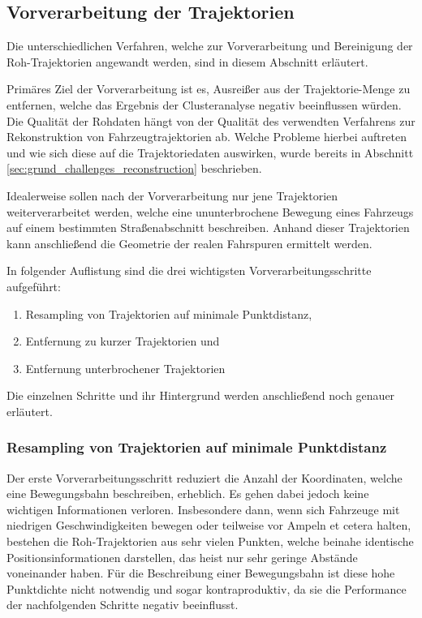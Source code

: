 \subsection{Vorverarbeitung der Trajektorien}
\label{sec:realisation_preprocessing}

Die unterschiedlichen Verfahren, welche zur Vorverarbeitung und Bereinigung der Roh-Trajektorien angewandt werden,
sind in diesem Abschnitt erläutert.

Primäres Ziel der Vorverarbeitung ist es, Ausreißer aus der
Trajektorie-Menge zu entfernen, welche das Ergebnis der Clusteranalyse negativ beeinflussen würden.
Die Qualität der Rohdaten hängt von der Qualität des verwendten Verfahrens zur Rekonstruktion von Fahrzeugtrajektorien
ab. Welche Probleme hierbei auftreten und wie sich diese auf die Trajektoriedaten auswirken, wurde bereits in
Abschnitt \ref{sec:grund_challenges_reconstruction} beschrieben.

Idealerweise sollen nach der Vorverarbeitung nur jene Trajektorien weiterverarbeitet werden,
welche eine ununterbrochene Bewegung eines Fahrzeugs auf einem bestimmten Straßenabschnitt beschreiben.
Anhand dieser Trajektorien kann anschließend die Geometrie der realen Fahrspuren ermittelt werden.

In folgender Auflistung sind die drei wichtigsten Vorverarbeitungsschritte aufgeführt:

\begin{enumerate}
    \item Resampling von Trajektorien auf minimale Punktdistanz,
    \item Entfernung zu kurzer Trajektorien und
    \item Entfernung unterbrochener Trajektorien
\end{enumerate}

Die einzelnen Schritte und ihr Hintergrund werden anschließend noch genauer erläutert.

\subsubsection{Resampling von Trajektorien auf minimale Punktdistanz}
Der erste Vorverarbeitungsschritt reduziert die Anzahl der Koordinaten, welche eine Bewegungsbahn beschreiben, erheblich.
Es gehen dabei jedoch keine wichtigen Informationen verloren.
Insbesondere dann, wenn sich Fahrzeuge mit niedrigen
Geschwindigkeiten bewegen oder teilweise vor Ampeln et cetera halten, bestehen die Roh-Trajektorien aus sehr vielen
Punkten, welche beinahe identische Positionsinformationen darstellen, das heist nur sehr geringe
Abstände voneinander haben. Für die Beschreibung einer Bewegungsbahn ist diese hohe Punktdichte nicht notwendig
und sogar kontraproduktiv, da sie die Performance der nachfolgenden Schritte negativ beeinflusst.

